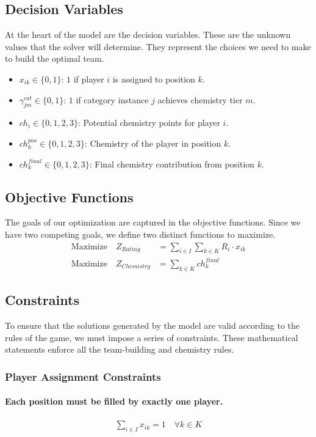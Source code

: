 \documentclass{article}
\begin{document}
\subsection{Decision Variables}
At the heart of the model are the decision variables. These are the unknown values that the solver will determine. They represent the choices we need to make to build the optimal team.
\begin{itemize}
    \item $x_{ik} \in \{0, 1\}$: $1$ if player $i$ is assigned to position $k$.
    \item $\gamma^{cat}_{jm} \in \{0, 1\}$: $1$ if category instance $j$ achieves chemistry tier $m$.
    \item $ch_i \in \{0, 1, 2, 3\}$: Potential chemistry points for player $i$.
    \item $ch^{pos}_k \in \{0, 1, 2, 3\}$: Chemistry of the player in position $k$.
    \item $ch^{final}_k \in \{0,1, 2, 3\}$: Final chemistry contribution from position $k$.
\end{itemize}

\subsection{Objective Functions}
The goals of our optimization are captured in the objective functions. Since we have two competing goals, we define two distinct functions to maximize.
\begin{align}
\text{Maximize} \quad Z_{Rating} &= \sum_{i \in I} \sum_{k \in K} R_i \cdot x_{ik} \\
\text{Maximize} \quad Z_{Chemistry} &= \sum_{k \in K} ch^{final}_k
\end{align}

\subsection{Constraints}
To ensure that the solutions generated by the model are valid according to the rules of the game, we must impose a series of constraints. These mathematical statements enforce all the team-building and chemistry rules.

\subsubsection{Player Assignment Constraints}
\paragraph{Each position must be filled by exactly one player.}
\begin{gather}
    \sum_{i \in I} x_{ik} = 1 \quad \forall k \in K
\end{gather}
\end{document}
